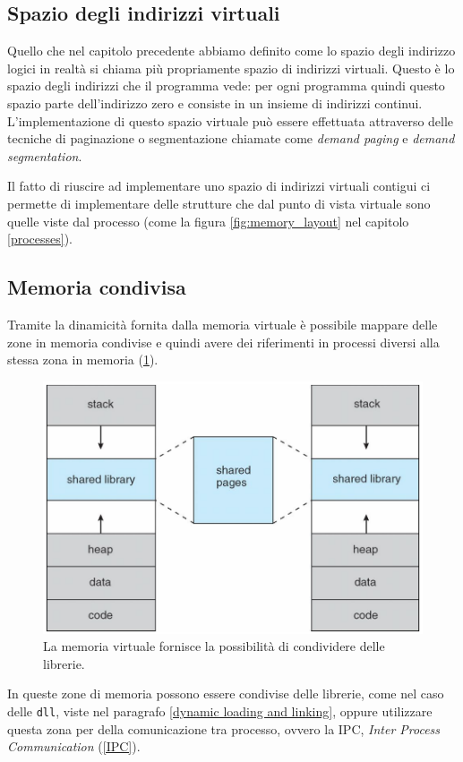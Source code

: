 % 
\subsection{Spazio degli indirizzi virtuali}
Quello che nel capitolo precedente abbiamo definito come lo spazio degli indirizzo logici in realtà si chiama più propriamente spazio di indirizzi virtuali. Questo è lo spazio degli indirizzi che il programma vede: per ogni programma quindi questo spazio parte dell'indirizzo zero e consiste in un insieme di indirizzi continui. L'implementazione di questo spazio virtuale può essere effettuata attraverso delle tecniche di paginazione o segmentazione chiamate come \textit{demand paging} e \textit{demand segmentation}. 

Il fatto di riuscire ad implementare uno spazio di indirizzi virtuali contigui ci permette di implementare delle strutture che dal punto di vista virtuale sono quelle viste dal processo (come la figura \ref{fig:memory_layout} nel capitolo \ref{processes}).

% 
\subsection{Memoria condivisa}
Tramite la dinamicità fornita dalla memoria virtuale è possibile mappare delle zone in memoria condivise e quindi avere dei riferimenti in processi diversi alla stessa zona in memoria (\ref{fig:shared_pages}). 
\begin{figure}[h]
    \centering
    \includegraphics[width = .4\textwidth]{../res/imgs/virtual memory/shared_pages.png}
    \caption{La memoria virtuale fornisce la possibilità di condividere delle librerie.}
    \label{fig:shared_pages}
\end{figure}
In queste zone di memoria possono essere condivise delle librerie, come nel caso delle \texttt{dll}, viste nel paragrafo \ref{dynamic loading and linking}, oppure utilizzare questa zona per della comunicazione tra processo, ovvero la IPC, \textit{Inter Process Communication} (\ref{IPC}).

% 
